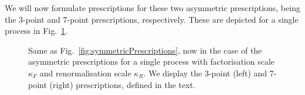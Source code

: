 We will now formulate prescriptions for these two asymmetric prescriptions, being the 3-point and 7-point prescriptions, respectively. These are depicted for a single process in Fig.~\ref{fig:AsymmetricPrescriptions1proc}.
\begin{figure}[t]
\centering
{}\qquad
{}
\begin{caption}{Same as Fig.~\ref{fig:symmetricPrescriptions},
    now in the case of the asymmetric prescriptions for a single process
    with factorisation scale $\kappa_F$ and renormalisation scale $\kappa_R$.
    We display the 
    $3$-point (left) and $7$-point (right) prescriptions, defined in the text.}
  \label{fig:AsymmetricPrescriptions1proc}
\end{caption}
\end{figure}
